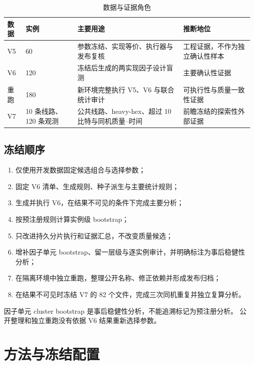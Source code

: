 \documentclass[11pt,a4paper]{article}
\begin{document}
\begin{table}[H]
\centering
\caption{数据与证据角色}
\begin{tabularx}{\textwidth}{C{1.4cm}C{1.5cm}Y Y}
\toprule
数据 & 实例 & 主要用途 & 推断地位 \\
\midrule
V5 & 60 & 参数冻结、实现等价、执行器与发布复核 & 工程证据，不作为独立确认性样本 \\
V6 & 120 & 冻结后生成的两实现因子设计盲测 & 主要确认性证据 \\
重跑 & 180 & 新环境完整执行 V5、V6 与联合统计审计 & 可执行性与质量一致性证据 \\
V7 & 10 条线路、120 条观测 & 公共线路、heavy-hex、超过 10 比特与同机质量--时间 & 前瞻冻结的探索性外部证据 \\
\bottomrule
\end{tabularx}
\end{table}

\subsection{冻结顺序}

\begin{enumerate}
  \item 仅使用开发数据固定候选组合与选择参数；
  \item 固定 V6 清单、生成规则、种子派生与主要统计规则；
  \item 生成并执行 V6，在结果不可见的条件下完成主要分析；
  \item 按预注册规则计算实例级 bootstrap；
  \item 只改进持久分片执行和证据汇总，不改变质量候选；
  \item 增补因子单元 bootstrap、留一层级与逐实例审计，并明确标注为事后稳健性分析；
  \item 在隔离环境中独立重跑，整理公开名称、修正依赖并形成发布归档；
  \item 在结果不可见时冻结 V7 的 82 个文件，完成三次同机重复并独立复算分析。
\end{enumerate}

\begin{notebox}
因子单元 cluster bootstrap 是事后稳健性分析，不能追溯标记为预注册分析。
公开整理和独立重跑没有依据 V6 结果重新选择参数。
\end{notebox}

\section{方法与冻结配置}
\end{document}
